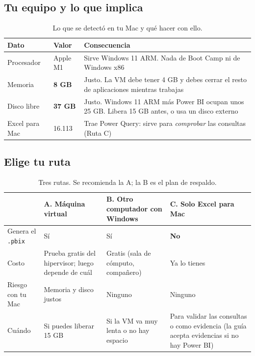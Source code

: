 \documentclass[11pt,letterpaper]{article}
\begin{document}
\subsection{Tu equipo y lo que implica}

\begin{table}[H]
\centering
\caption{Lo que se detectó en tu Mac y qué hacer con ello.}
\begin{tabularx}{\linewidth}{l l L}
\toprule
Dato & Valor & Consecuencia \\
\midrule
Procesador & Apple M1 & Sirve Windows 11 ARM. Nada de Boot Camp ni de Windows x86 \\
Memoria & \textbf{8 GB} & Justo. La VM debe tener 4 GB y debes cerrar el resto de aplicaciones mientras trabajas \\
Disco libre & \textbf{37 GB} & Justo. Windows 11 ARM más Power BI ocupan unos 25 GB. Libera 15 GB antes, o usa un disco externo \\
Excel para Mac & 16.113 & Trae Power Query: sirve para \emph{comprobar} las consultas (Ruta C) \\
\bottomrule
\end{tabularx}
\end{table}

\subsection{Elige tu ruta}

\begin{table}[H]
\centering
\caption{Tres rutas. Se recomienda la A; la B es el plan de respaldo.}
\begin{tabularx}{\linewidth}{l L L L}
\toprule
 & \textbf{A. Máquina virtual} & \textbf{B. Otro computador con Windows} & \textbf{C. Solo Excel para Mac} \\
\midrule
Genera el \texttt{.pbix} & Sí & Sí & \textbf{No} \\
Costo & Prueba gratis del hipervisor; luego depende de cuál & Gratis (sala de cómputo, compañero) & Ya lo tienes \\
Riesgo con tu Mac & Memoria y disco justos & Ninguno & Ninguno \\
Cuándo & Si puedes liberar 15 GB & Si la VM va muy lenta o no hay espacio & Para validar las consultas o como evidencia (la guía acepta evidencias si no hay Power BI) \\
\bottomrule
\end{tabularx}
\end{table}
\end{document}

